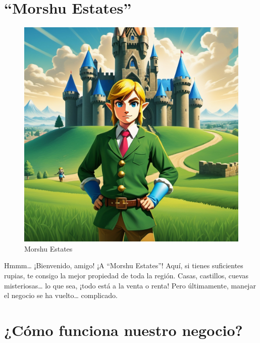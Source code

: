 \documentclass[
  letterpaper,
  DIV=11,
  numbers=noendperiod]{scrreprt}
\begin{document}

\chapter{``Morshu Estates''}\label{morshu-estates}

\begin{figure}[H]

{\centering \includegraphics{Inmobiliaria/Morshu_Estates.jpg}

}

\caption{Morshu Estates}

\end{figure}%

Hmmm\ldots{} ¡Bienvenido, amigo! ¡A ``Morshu Estates''! Aquí, si tienes
suficientes rupias, te consigo la mejor propiedad de toda la región.
Casas, castillos, cuevas misteriosas\ldots{} lo que sea, ¡todo está a la
venta o renta! Pero últimamente, manejar el negocio se ha vuelto\ldots{}
complicado.


\chapter{¿Cómo funciona nuestro
negocio?}\label{cuxf3mo-funciona-nuestro-negocio}
\end{document}
